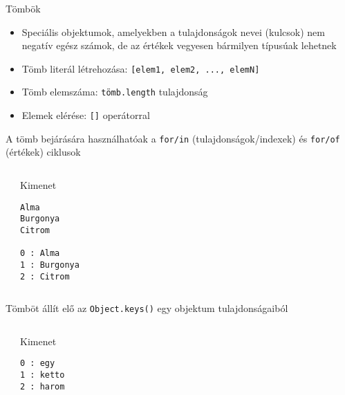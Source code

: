 \begin{frame}
  Tömbök
  \begin{itemize}
    \item Speciális objektumok, amelyekben a tulajdonságok nevei (kulcsok) nem negatív egész számok, de az értékek vegyesen bármilyen típusúak lehetnek
    \item Tömb literál létrehozása: \texttt{[elem1, elem2, ..., elemN]}
    \item Tömb elemszáma: \texttt{tömb.length} tulajdonság
    \item Elemek elérése: \texttt{[]} operátorral
  \end{itemize}
  \footnotesize
  \begin{exampleblock}{}
    \vspace{-0.3cm}
    
    \vspace{-0.3cm}
  \end{exampleblock}
\end{frame}

\begin{frame}[fragile]
  A tömb bejárására használhatóak a \texttt{for/in} (tulajdonságok/indexek) és \texttt{for/of} (értékek) ciklusok
  \footnotesize
  \begin{columns}[T]
      \begin{exampleblock}{}
        \vspace{-0.3cm}
        
        \vspace{-0.3cm}
      \end{exampleblock}
      \begin{block}{Kimenet}
        \begin{verbatim}
Alma
Burgonya
Citrom

0 : Alma
1 : Burgonya
2 : Citrom
\end{verbatim}
      \end{block}
  \end{columns}
\end{frame}

\begin{frame}[fragile]
  Tömböt állít elő az \texttt{Object.keys()} egy objektum tulajdonságaiból
  \small
  \begin{columns}[T]
      \begin{exampleblock}{}
        
      \end{exampleblock}
      \begin{block}{Kimenet}
        \begin{verbatim}
0 : egy
1 : ketto
2 : harom
\end{verbatim}
      \end{block}
  \end{columns}
\end{frame}

